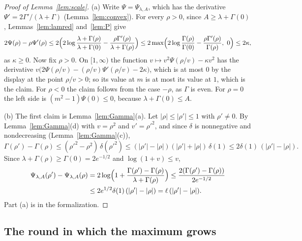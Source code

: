 \documentclass[12pt]{amsart}
\theoremstyle{definition}
\numberwithin{equation}{section}
\begin{document}
\begin{proof}[Proof of Lemma~\ref{lem:scale}]
(a) Write $\Psi=\Psi_{\lambda,A}$, which has the derivative $\Psi'=2\Gamma'/(\lambda+\Gamma)$ (Lemma~\ref{lem:convex}). For every $\rho>0$, since $A\ge\lambda+\Gamma(0)$, Lemmas~\ref{lem:lamred} and~\ref{lem:P} give
\[
2\Psi(\rho)-\rho\Psi'(\rho)\leq2\Bigl(2\log\frac{\lambda+\Gamma(\rho)}{\lambda+\Gamma(0)}-\frac{\rho\Gamma'(\rho)}{\lambda+\Gamma(\rho)}\Bigr)\leq2\max\Bigl(2\log\frac{\Gamma(\rho)}{\Gamma(0)}-\frac{\rho\Gamma'(\rho)}{\Gamma(\rho)},\ 0\Bigr)\leq2\kappa,
\]
as $\kappa\ge0$. Now fix $\rho>0$. On $[1,\infty)$ the function $v\mapsto v^2\Psi(\rho/v)-\kappa v^2$ has the derivative $v\bigl(2\Psi(\rho/v)-(\rho/v)\Psi'(\rho/v)-2\kappa\bigr)$, which is at most $0$ by the display at the point $\rho/v>0$; so its value at $m$ is at most its value at $1$, which is the claim. For $\rho<0$ the claim follows from the case $-\rho$, as $\Gamma$ is even. For $\rho=0$ the left side is $(m^2-1)\Psi(0)\le0$, because $\lambda+\Gamma(0)\le A$.

(b) The first claim is Lemma~\ref{lem:Gamma}(a). Let $|\rho|\le|\rho'|\le1$ with $\rho'\ne0$. By Lemma~\ref{lem:Gamma}(d) with $v=\rho^2$ and $v'=\rho'^2$, and since $\delta$ is nonnegative and nondecreasing (Lemma~\ref{lem:Gamma}(c)),
\[
\Gamma(\rho')-\Gamma(\rho)\leq(\rho'^2-\rho^2)\,\delta(\rho'^2)\leq(|\rho'|-|\rho|)(|\rho'|+|\rho|)\,\delta(1)\leq2\delta(1)\,(|\rho'|-|\rho|).
\]
Since $\lambda+\Gamma(\rho)\ge\Gamma(0)=2e^{-1/2}$ and $\log(1+v)\le v$,
\begin{align*}
\Psi_{\lambda,A}(\rho')-\Psi_{\lambda,A}(\rho)&=2\log\Bigl(1+\frac{\Gamma(\rho')-\Gamma(\rho)}{\lambda+\Gamma(\rho)}\Bigr)\leq\frac{2(\Gamma(\rho')-\Gamma(\rho))}{2e^{-1/2}}\\
&\leq2e^{1/2}\delta(1)\,(|\rho'|-|\rho|)=\ell\,(|\rho'|-|\rho|).
\end{align*}
Part (a) is  in the formalization.
\end{proof}

\subsection{The round in which the maximum grows}
\end{document}
